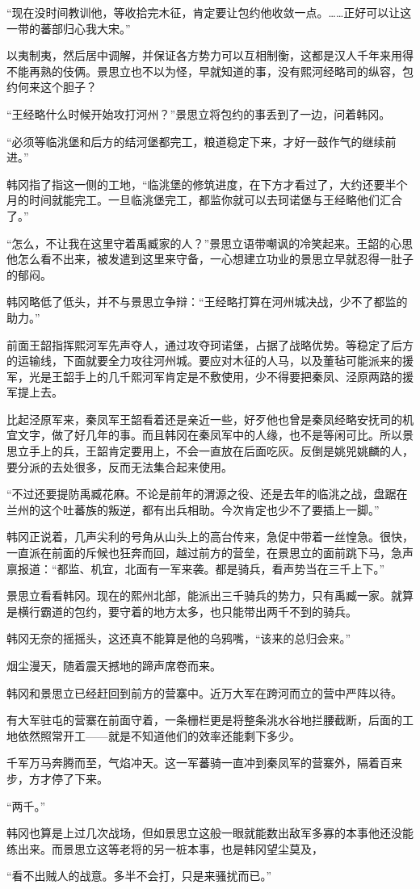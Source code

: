 “现在没时间教训他，等收拾完木征，肯定要让包约他收敛一点。……正好可以让这一带的蕃部归心我大宋。”

以夷制夷，然后居中调解，并保证各方势力可以互相制衡，这都是汉人千年来用得不能再熟的伎俩。景思立也不以为怪，早就知道的事，没有熙河经略司的纵容，包约何来这个胆子？

“王经略什么时候开始攻打河州？”景思立将包约的事丢到了一边，问着韩冈。

“必须等临洮堡和后方的结河堡都完工，粮道稳定下来，才好一鼓作气的继续前进。”

韩冈指了指这一侧的工地，“临洮堡的修筑进度，在下方才看过了，大约还要半个月的时间就能完工。一旦临洮堡完工，都监你就可以去珂诺堡与王经略他们汇合了。”

“怎么，不让我在这里守着禹臧家的人？”景思立语带嘲讽的冷笑起来。王韶的心思他怎么看不出来，被发遣到这里来守备，一心想建立功业的景思立早就忍得一肚子的郁闷。

韩冈略低了低头，并不与景思立争辩：“王经略打算在河州城决战，少不了都监的助力。”

前面王韶指挥熙河军先声夺人，通过攻夺珂诺堡，占据了战略优势。等稳定了后方的运输线，下面就要全力攻往河州城。要应对木征的人马，以及董毡可能派来的援军，光是王韶手上的几千熙河军肯定是不敷使用，少不得要把秦凤、泾原两路的援军提上去。

比起泾原军来，秦凤军王韶看着还是亲近一些，好歹他也曾是秦凤经略安抚司的机宜文字，做了好几年的事。而且韩冈在秦凤军中的人缘，也不是等闲可比。所以景思立手上的兵，王韶肯定要用上，不会一直放在后面吃灰。反倒是姚兕姚麟的人，要分派的去处很多，反而无法集合起来使用。

“不过还要提防禹臧花麻。不论是前年的渭源之役、还是去年的临洮之战，盘踞在兰州的这个吐蕃族的叛逆，都有出兵相助。今次肯定也少不了要插上一脚。”

韩冈正说着，几声尖利的号角从山头上的高台传来，急促中带着一丝惶急。很快，一直派在前面的斥候也狂奔而回，越过前方的营垒，在景思立的面前跳下马，急声禀报道：“都监、机宜，北面有一军来袭。都是骑兵，看声势当在三千上下。”

景思立看看韩冈。现在的熙州北部，能派出三千骑兵的势力，只有禹臧一家。就算是横行霸道的包约，要守着的地方太多，也只能带出两千不到的骑兵。

韩冈无奈的摇摇头，这还真不能算是他的乌鸦嘴，“该来的总归会来。”

烟尘漫天，随着震天撼地的蹄声席卷而来。

韩冈和景思立已经赶回到前方的营寨中。近万大军在跨河而立的营中严阵以待。

有大军驻屯的营寨在前面守着，一条栅栏更是将整条洮水谷地拦腰截断，后面的工地依然照常开工——就是不知道他们的效率还能剩下多少。

千军万马奔腾而至，气焰冲天。这一军蕃骑一直冲到秦凤军的营寨外，隔着百来步，方才停了下来。

“两千。”

韩冈也算是上过几次战场，但如景思立这般一眼就能数出敌军多寡的本事他还没能练出来。而景思立这等老将的另一桩本事，也是韩冈望尘莫及，

“看不出贼人的战意。多半不会打，只是来骚扰而已。”

